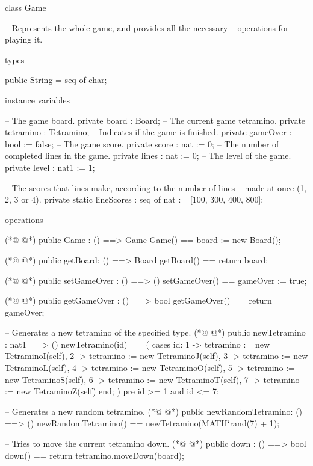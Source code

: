 \begin{vdmpp}[breaklines=true]
class Game

 -- Represents the whole game, and provides all the necessary
 -- operations for playing it.
 
 
 types
 
  public String = seq of char;


 instance variables
  
  -- The game board.
  private board  : Board;
  -- The current game tetramino.
  private tetramino : Tetramino;
  -- Indicates if the game is finished.
  private gameOver : bool   := false; 
  -- The game score. 
  private score  : nat   := 0;
  -- The number of completed lines in the game.
  private lines  : nat   := 0;
  -- The level of the game. 
  private level  : nat1   := 1;
  
  -- The scores that lines make, according to the number of lines 
  -- made at once (1, 2, 3 or 4).
  private static lineScores : seq of nat
   := [100, 300, 400, 800];
  
  
 operations
 
(*@
\label{Game:35}
@*)
  public Game : () ==> Game
  Game() ==
   board := new Board();
    
(*@
\label{getBoard:39}
@*)
    public getBoard: () ==> Board
    getBoard() ==
     return board;
        
(*@
\label{setGameOver:43}
@*)
  public setGameOver : () ==> ()
  setGameOver() ==
   gameOver := true;
   
(*@
\label{getGameOver:47}
@*)
  public getGameOver : () ==> bool
  getGameOver() ==
   return gameOver;
       
    -- Generates a new tetramino of the specified type.
(*@
\label{newTetramino:52}
@*)
  public newTetramino : nat1 ==> ()
  newTetramino(id) == (  
   cases id:
    1 -> tetramino := new TetraminoI(self),
    2 -> tetramino := new TetraminoJ(self),
    3 -> tetramino := new TetraminoL(self),
    4 -> tetramino := new TetraminoO(self),
    5 -> tetramino := new TetraminoS(self),
    6 -> tetramino := new TetraminoT(self),
    7 -> tetramino := new TetraminoZ(self)
   end;
  )
  pre id >= 1 and id <= 7;
  
    -- Generates a new random tetramino.
(*@
\label{newRandomTetramino:67}
@*)
  public newRandomTetramino: () ==> ()
  newRandomTetramino() == 
   newTetramino(MATH`rand(7) + 1);
  
    -- Tries to move the current tetramino down.
(*@
\label{down:72}
@*)
  public down : () ==> bool
  down() ==
   return tetramino.moveDown(board);
   

\end{vdmpp}
